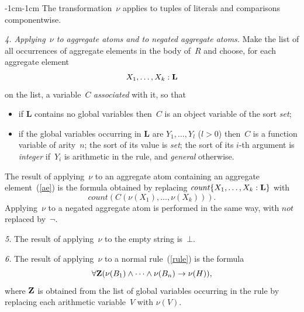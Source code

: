 \documentclass[11pt]{article}
\def\lrar{\leftrightarrow}
\def\beq{\begin{equation}}
\def\eeq#1{\label{#1}\end{equation}}
\def\ba{\begin{array}}
\def\ea{\end{array}}
\def\sd{\mathit{SD}}
\newcommand{\co}{\ensuremath{\mathit{count}}}
\newcommand{\no}{\ensuremath{\mathit{not}}}
\begin{document}
\begin{adjustwidth}{-1cm}{-1cm}
\medskip
The transformation~$\nu$ applies to tuples of literals and comparisons
componentwise.

\medskip\noindent \emph{4. Applying~$\nu$ to aggregate atoms and to negated
aggregate atoms.}  Make the list of all occurrences of
aggregate elements in the body of~$R$ and choose, for each
aggregate element
\beq
X_1,\dots,X_k:{\bf L}
\eeq{ae}
on the list, a variable~$C$ \emph{associated} with it, so that
\begin{itemize}
\item if {\bf L} contains no global variables
  then~$C$ is an object variable of the sort \emph{set};
\item if the global variables occurring in {\bf L} are $Y_1,\dots,Y_l$
  ($l>0$) then~$C$ is a function variable of arity~$n$; the sort of its value
  is \emph{set}; the sort of its $i$-th argument is \emph{integer}
  if~$Y_i$ is arithmetic in the rule, and \emph{general}
  otherwise.
\end{itemize}
% 
% 
The result of applying~$\nu$ to an aggregate atom
containing an aggregate element~(\ref{ae}) is the formula
obtained by replacing $\co\{X_1,\dots,X_k:{\bf L}\}$ with
$$\co(C(\nu(X_1),\dots,\nu(X_k))).$$
Applying~$\nu$ to a negated aggregate atom is performed in the same way,
with $\no$ replaced by~$\neg$.

\medskip\noindent
\emph{5.} The result of applying~$\nu$ to the empty string is~$\bot$.

\medskip\noindent
\emph{6.} The result of applying~$\nu$ to a normal rule~(\ref{rule}) is
the formula
\beq
\forall {\bf Z}(\nu(B_1)\land\cdots\land\nu(B_n) \to \nu(H)),
\eeq{nu}
where $\bf Z$ is obtained from the list of global
variables occurring in the rule
by replacing each arithmetic variable~$V$ with $\nu(V)$.


\end{adjustwidth}
\end{document}
